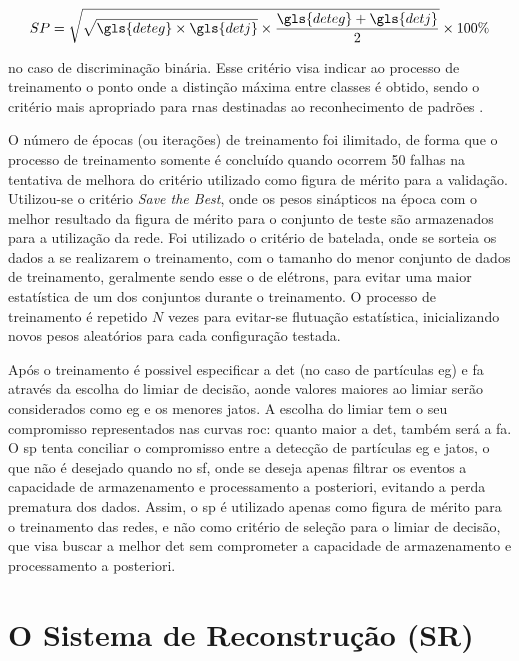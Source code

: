 \begin{equation} \label{eq:produto_sp}
SP = \sqrt{ \sqrt{\gls{deteg}\times \gls{detj}}\times\frac{\gls{deteg}+\gls{detj}}{2}}\times100\%
\end{equation}

\noindent no caso de discriminação binária. Esse critério visa indicar ao
processo de treinamento o ponto onde a distinção máxima entre classes é obtido,
sendo o critério mais apropriado para \glspl{rna} destinadas ao reconhecimento de
padrões \cite{tese_torres}.

O número de épocas (ou iterações) de treinamento foi ilimitado, de forma que o
processo de treinamento somente é concluído quando ocorrem 50 falhas na tentativa
de melhora do critério utilizado como figura de mérito para a validação. 
Utilizou-se o critério \emph{Save the Best}, onde os pesos sinápticos na época com 
o melhor resultado da figura de mérito para o conjunto de teste são armazenados 
para a utilização da rede. Foi utilizado o critério de batelada, onde se sorteia os
dados a se realizarem o treinamento, com o tamanho do menor 
conjunto de dados de treinamento, geralmente sendo esse o de elétrons, para
evitar uma maior estatística de um dos conjuntos durante o treinamento. O
processo de treinamento é repetido $N$ vezes para evitar-se flutuação
estatística, inicializando novos pesos aleatórios para cada configuração 
testada.


Após o treinamento é possivel especificar a \gls{det} (no caso de partículas \gls{eg}) 
e \gls{fa} através da escolha do limiar de decisão, aonde valores maiores ao limiar serão considerados
como \gls{eg} e os menores jatos. A escolha do limiar tem o seu compromisso
representados nas curvas \gls{roc}: quanto maior a \gls{det}, também será a
\gls{fa}. O \gls{sp} tenta conciliar o compromisso entre a detecção de
partículas \gls{eg} e jatos, o que não é desejado quando no \gls{sf}, onde se
deseja apenas filtrar os eventos a capacidade de armazenamento e processamento a
posteriori, evitando a perda prematura dos dados. Assim, o \gls{sp} é utilizado
apenas como figura de mérito para o treinamento das redes, e não como critério
de seleção para o limiar de decisão, que visa buscar a melhor \gls{det} sem
comprometer a capacidade de armazenamento e processamento a posteriori.

\section{O Sistema de Reconstrução (SR)}
\label{sec:sr}

